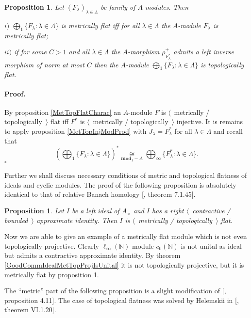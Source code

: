 \documentclass[12pt]{article}
\newcommand{\isom}[1]{\mathop{\mathbin{\cong}}\limits_{#1}}
\newtheorem{proposition}[theorem]{Proposition}
\renewenvironment{proof}{\paragraph{Proof.}}{\hfill$\square$\medskip}
\begin{document}
\begin{proposition}\label{MetTopFlatModCoProd} Let $(F_\lambda)_{\lambda\in\Lambda}$ be family of $A$-modules. Then 

$i)$ $\bigoplus_1\{F_\lambda:\lambda\in\Lambda\}$ is metrically flat iff for all $\lambda\in\Lambda$ the $A$-module $F_\lambda$ is metrically flat;

$ii)$ if for some $C>1$ and all $\lambda\in\Lambda$ the $A$-morphism $\rho_{F_\lambda^*}^+$ admits a left inverse morphism of norm at most $C$ then the $A$-module $\bigoplus_1\{F_\lambda:\lambda\in\Lambda\}$ is topologically flat.
\end{proposition}
\begin{proof} By proposition \ref{MetTopFlatCharac} an $A$-module $F$ is $\langle$~metrically / topologically~$\rangle$ flat iff $F^*$ is $\langle$~metrically / topologically~$\rangle$ injective. It is remains to apply proposition \ref{MetTopInjModProd} with $J_\lambda=F_\lambda^*$ for all $\lambda\in\Lambda$ and recall that 
$$
\left(\bigoplus_1\{ F_\lambda:\lambda\in\Lambda\}\right)^*\isom{\mathbf{mod}_1-A}\bigoplus_\infty\{ F_\lambda^*:\lambda\in\Lambda\}.
$$
\end{proof}

Further we shall discuss necessary conditions of metric and topological flatness of ideals and cyclic modules. The proof of the following proposition is absolutely identical to that of relative Banach homology [\cite{HelBanLocConvAlg}, theorem 7.1.45].

\begin{proposition}\label{MetTopFlatIdealsInUnitalAlg} Let $I$ be a left ideal of $A_\times $ and $I$ has a right $\langle$~contractive / bounded~$\rangle$ approximate identity. Then $I$ is $\langle$~metrically / topologically~$\rangle$ flat.
\end{proposition}

Now we are able to give an example of a metrically flat module which is not even topologically projective. Clearly $\ell_\infty(\mathbb{N})$-module $c_0(\mathbb{N})$ is not unital as ideal but admits a contractive approximate identity. By theorem \ref{GoodCommIdealMetTopProjIsUnital} it is not topologically projective, but it is metrically flat by proposition \ref{MetTopFlatIdealsInUnitalAlg}.

The ``metric'' part of the following proposition is a slight modification of [\cite{WhiteInjmoduAlg}, proposition 4.11]. The case of topological flatness was solved by Helemskii in [\cite{HelHomolBanTopAlg}, theorem VI.1.20].
\end{document}
